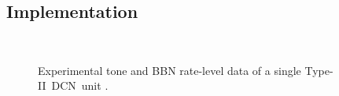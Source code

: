 


\subsection{Implementation}


\begin{figure}[htb]
\centering
\\
\caption[Experimental data of a single Type-II~DCN~unit]{Experimental tone and BBN rate-level data of a single Type-II~DCN~unit \citep[Fig.~8]{SpirouDavisEtAl:1999}.}\label{fig:SpirouFig8}
\end{figure}



